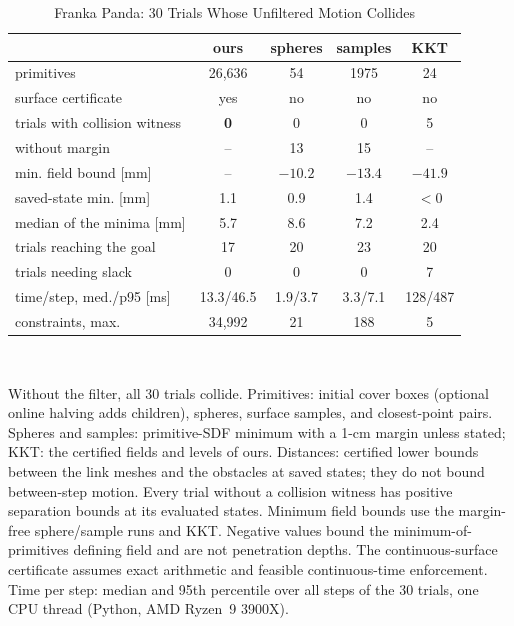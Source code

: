 \documentclass[journal]{IEEEtran}
\theoremstyle{definition}
\newcommand{\timeOurs}{13.3/46.5}\newcommand{\timeSph}{1.9/3.7}\newcommand{\timePts}{3.3/7.1}\newcommand{\timeKKT}{128/487}
\begin{document}
\begin{table}[t]
\caption{Franka Panda: 30 Trials Whose Unfiltered Motion Collides}
\label{tab:franka}
\centering
\footnotesize
\setlength{\tabcolsep}{2pt}
\renewcommand{\arraystretch}{1.05}
\begin{tabular}{lcccc}
\toprule
& ours & spheres & samples & KKT\\
\midrule
primitives & 26{,}636 & 54 & 1975 & 24\\
surface certificate & yes & no & no & no\\
trials with collision witness & \textbf{0} & 0 & 0 & 5\\
\quad without margin & -- & 13 & 15 & --\\
\quad min. field bound [mm] & -- & $-10.2$ & $-13.4$ & $-41.9$\\
saved-state min. [mm] & 1.1 & 0.9 & 1.4 & $<0$\\
median of the minima [mm] & 5.7 & 8.6 & 7.2 & 2.4\\
trials reaching the goal & 17 & 20 & 23 & 20\\
trials needing slack & 0 & 0 & 0 & 7\\
time/step, med./p95 [ms] & \timeOurs & \timeSph & \timePts & \timeKKT\\
constraints, max. & 34{,}992 & 21 & 188 & 5\\
\bottomrule
\end{tabular}
\\[3pt]
\parbox{\columnwidth}{\footnotesize Without the filter, all 30 trials collide. Primitives: initial cover boxes
(optional online halving adds children),
spheres, surface samples, and closest-point pairs. Spheres and samples: primitive-SDF minimum with a
1-cm margin unless stated; KKT: the certified fields and levels of ours. Distances: certified lower
bounds between the link meshes and the obstacles at saved states; they do not bound between-step motion.
Every trial without a collision witness has positive separation bounds at its evaluated states.
Minimum field bounds use the margin-free sphere/sample runs and KKT. Negative values bound
the minimum-of-primitives defining field and are not penetration depths.
The continuous-surface certificate assumes exact arithmetic and feasible continuous-time enforcement.
Time per step: median and 95th percentile over all steps of the 30 trials, one CPU thread
(Python, AMD Ryzen~9 3900X).}
\end{table}
\end{document}
